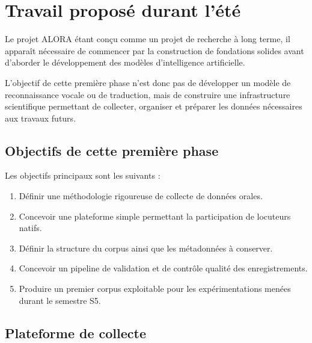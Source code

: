 \section{Travail proposé durant l'été}

Le projet ALORA étant conçu comme un projet de recherche à long terme,
il apparaît nécessaire de commencer par la construction de fondations
solides avant d'aborder le développement des modèles d'intelligence
artificielle.

L'objectif de cette première phase n'est donc pas de développer un
modèle de reconnaissance vocale ou de traduction, mais de construire
une infrastructure scientifique permettant de collecter, organiser et
préparer les données nécessaires aux travaux futurs.


\subsection{Objectifs de cette première phase}

Les objectifs principaux sont les suivants :

\begin{enumerate}

\item Définir une méthodologie rigoureuse de collecte de données
orales.

\item Concevoir une plateforme simple permettant la participation de
locuteurs natifs.

\item Définir la structure du corpus ainsi que les métadonnées à
conserver.

\item Concevoir un pipeline de validation et de contrôle qualité des
enregistrements.

\item Produire un premier corpus exploitable pour les expérimentations
menées durant le semestre S5.

\end{enumerate}


\subsection{Plateforme de collecte}

